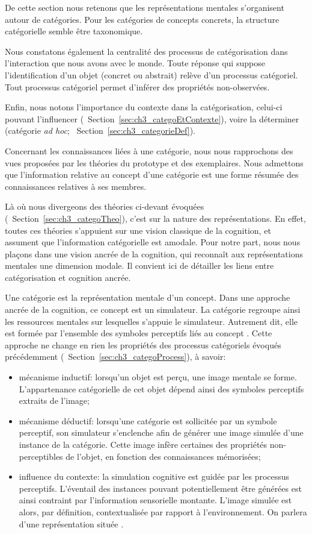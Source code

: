 De cette section nous retenons que les représentations mentales s'organisent autour de catégories. Pour les catégories de concepts concrets, la structure catégorielle semble être taxonomique.

Nous constatons également la centralité des processus de catégorisation dans l'interaction que nous avons avec le monde. Toute réponse qui suppose l'identification d'un objet (concret ou abstrait) relève d'un processus catégoriel. Tout processus catégoriel permet d'inférer des propriétés non-observées.

Enfin, nous notons l'importance du contexte dans la catégorisation, celui-ci pouvant l'influencer (\cf~Section~\ref{sec:ch3_categoEtContexte}), voire la déterminer (catégorie \emph{ad hoc}; \cf~Section~\ref{sec:ch3_categorieDef}).

Concernant les connaissances liées à une catégorie, nous nous rapprochons des vues proposées par les théories du prototype et des exemplaires. Nous admettons que l'information relative au concept d'une catégorie est une forme résumée des connaissances relatives à ses membres.

Là où nous divergeons des théories ci-devant évoquées (\cf~Section~\ref{sec:ch3_categoTheo}), c'est sur la nature des représentations. En effet, toutes ces théories s'appuient sur une vision classique de la cognition, et assument que l'information catégorielle est amodale. Pour notre part, nous nous plaçons dans une vision ancrée de la cognition, qui reconnaît aux représentations mentales une dimension modale. Il convient ici de détailler les liens entre catégorisation et cognition ancrée.

Une catégorie est la représentation mentale d'un concept. Dans une approche ancrée de la cognition, ce concept est un simulateur. La catégorie regroupe ainsi les ressources mentales sur lesquelles s'appuie le simulateur. Autrement dit, elle est formée par l'ensemble des symboles perceptifs liés au concept \citep{barsalou2003situated}. Cette approche ne change en rien les propriétés des processus catégoriels évoqués précédemment (\cf~Section~\ref{sec:ch3_categoProcess}), à savoir:

\begin{itemize}
\item mécanisme inductif: lorsqu'un objet est perçu, une image mentale se forme. L'appartenance catégorielle de cet objet dépend ainsi des symboles perceptifs extraits de l'image;
\item mécanisme déductif: lorsqu'une catégorie est sollicitée par un symbole perceptif, son simulateur s'enclenche afin de générer une image simulée d'une instance de la catégorie. Cette image infère certaines des propriétés non-perceptibles de l'objet, en fonction des connaissances mémorisées;
\item influence du contexte: la simulation cognitive est guidée par les processus perceptifs. L'éventail des instances pouvant potentiellement être générées est ainsi contraint par l'information sensorielle montante. L'image simulée est alors, par définition, contextualisée par rapport à l'environnement. On parlera d'une représentation située \citep{barsalou2003situated,barsalou2005situating}.
\end{itemize}

